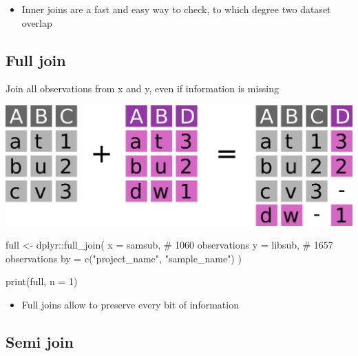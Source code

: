 \documentclass[
  letterpaper,
]{book}
\newenvironment{Shaded}{}{}
\newcommand{\AttributeTok}[1]{\textcolor[rgb]{0.84,0.23,0.29}{#1}}
\newcommand{\CommentTok}[1]{\textcolor[rgb]{0.42,0.45,0.49}{#1}}
\newcommand{\DecValTok}[1]{\textcolor[rgb]{0.00,0.36,0.77}{#1}}
\newcommand{\FunctionTok}[1]{\textcolor[rgb]{0.44,0.26,0.76}{#1}}
\newcommand{\NormalTok}[1]{\textcolor[rgb]{0.14,0.16,0.18}{#1}}
\newcommand{\OtherTok}[1]{\textcolor[rgb]{0.44,0.26,0.76}{#1}}
\newcommand{\SpecialCharTok}[1]{\textcolor[rgb]{0.00,0.36,0.77}{#1}}
\newcommand{\StringTok}[1]{\textcolor[rgb]{0.01,0.18,0.38}{#1}}
\providecommand{\tightlist}{%
  \setlength{\itemsep}{0pt}\setlength{\parskip}{0pt}}\usepackage{longtable,booktabs,array}
\begin{document}
\begin{itemize}
\tightlist
\item
  Inner joins are a fast and easy way to check, to which degree two
  dataset overlap
\end{itemize}

\hypertarget{full-join}{%
\subsection{Full join}\label{full-join}}

Join all observations from x and y, even if information is missing

\includegraphics{assets/images/chapters/introduction-to-r/full_join.png}

\begin{Shaded}
\begin{Highlighting}[]
\NormalTok{full }\OtherTok{\textless{}{-}}\NormalTok{ dplyr}\SpecialCharTok{::}\FunctionTok{full\_join}\NormalTok{(}
  \AttributeTok{x =}\NormalTok{ samsub,                           }\CommentTok{\# 1060 observations}
  \AttributeTok{y =}\NormalTok{ libsub,                           }\CommentTok{\# 1657 observations}
  \AttributeTok{by =} \FunctionTok{c}\NormalTok{(}\StringTok{"project\_name"}\NormalTok{, }\StringTok{"sample\_name"}\NormalTok{)}
\NormalTok{)}

\FunctionTok{print}\NormalTok{(full, }\AttributeTok{n =} \DecValTok{1}\NormalTok{)}
\end{Highlighting}
\end{Shaded}

\begin{itemize}
\tightlist
\item
  Full joins allow to preserve every bit of information
\end{itemize}

\hypertarget{semi-join}{%
\subsection{Semi join}\label{semi-join}}
\end{document}
